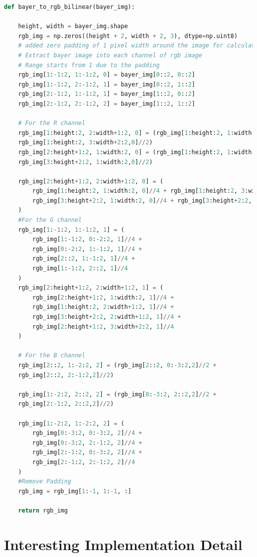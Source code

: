 \begin{lstlisting}[language=python]
def bayer_to_rgb_bilinear(bayer_img):
    
    height, width = bayer_img.shape
    rgb_img = np.zeros((height + 2, width + 2, 3), dtype=np.uint8)
    # added zero padding of 1 pixel width around the image for calculation efficiency    
    # Extract bayer image into each channel of rgb image
    # Range starts from 1 due to the padding
    rgb_img[1:-1:2, 1:-1:2, 0] = bayer_img[0::2, 0::2]    
    rgb_img[1:-1:2, 2:-1:2, 1] = bayer_img[0::2, 1::2]
    rgb_img[2:-1:2, 1:-1:2, 1] = bayer_img[1::2, 0::2]
    rgb_img[2:-1:2, 2:-1:2, 2] = bayer_img[1::2, 1::2]

    # For the R channel
    rgb_img[1:height:2, 2:width+1:2, 0] = (rgb_img[1:height:2, 1:width:2,0]//2 + 
    rgb_img[1:height:2, 3:width+2:2,0]//2) 
    rgb_img[2:height+1:2, 1:width:2, 0] = (rgb_img[1:height:2, 1:width:2,0]//2 + 
    rgb_img[3:height+2:2, 1:width:2,0]//2) 

    rgb_img[2:height+1:2, 2:width+1:2, 0] = (
        rgb_img[1:height:2, 1:width:2, 0]//4 + rgb_img[1:height:2, 3:width+2:2, 0]//4 +
        rgb_img[3:height+2:2, 1:width:2, 0]//4 + rgb_img[3:height+2:2, 3:width+2:2, 0]//4
    ) 
    #For the G channel
    rgb_img[1:-1:2, 1:-1:2, 1] = (
        rgb_img[1:-1:2, 0:-2:2, 1]//4 + 
        rgb_img[0:-2:2, 1:-1:2, 1]//4 +
        rgb_img[2::2, 1:-1:2, 1]//4 + 
        rgb_img[1:-1:2, 2::2, 1]//4
    )
    rgb_img[2:height+1:2, 2:width+1:2, 1] = (
        rgb_img[2:height+1:2, 1:width:2, 1]//4 + 
        rgb_img[1:height:2, 2:width+1:2, 1]//4 +
        rgb_img[3:height+2:2, 2:width+1:2, 1]//4 + 
        rgb_img[2:height+1:2, 3:width+2:2, 1]//4
    )

    # For the B channel
    rgb_img[2::2, 1:-2:2, 2] = (rgb_img[2::2, 0:-3:2,2]//2 +
    rgb_img[2::2, 2:-1:2,2]//2) 
    
    rgb_img[1:-2:2, 2::2, 2] = (rgb_img[0:-3:2, 2::2,2]//2 +
    rgb_img[2:-1:2, 2::2,2]//2) 
    
    rgb_img[1:-2:2, 1:-2:2, 2] = (
        rgb_img[0:-3:2, 0:-3:2, 2]//4 + 
        rgb_img[0:-3:2, 2:-1:2, 2]//4 +
        rgb_img[2:-1:2, 0:-3:2, 2]//4 + 
        rgb_img[2:-1:2, 2:-1:2, 2]//4
    )    
    #Remove Padding
    rgb_img = rgb_img[1:-1, 1:-1, :]
    
    return rgb_img
    \end{lstlisting}


\section*{Interesting Implementation Detail}

